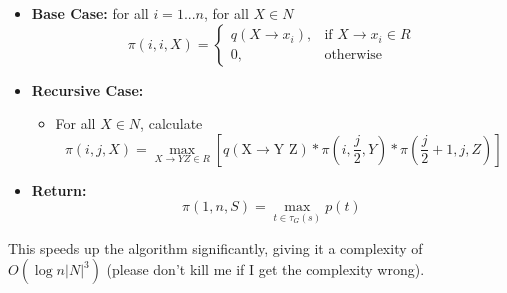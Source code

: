 \documentclass[11pt]{scrartcl}
\newcommand{\n}[1]{\ensuremath{\text{#1}}}
\begin{document}
\begin{itemize}
\item \textbf{Base Case:} for all $i = 1 ... n$, for all $X \in N$
\[ \pi(i,i,X) = \begin{cases}
q(X \rightarrow x_i),& \n{if } X \rightarrow x_i \in R \\
0,& \n{otherwise}
\end{cases}
\]
\item \textbf{Recursive Case:}
\begin{itemize}
\item For all $X \in N$, calculate
\[ \pi(i, j, X) = \max_{X \rightarrow YZ \in R} \left[ q(\n{X} \rightarrow \n{Y Z}) * \pi\left(i, \frac{j}{2}, Y\right) * \pi\left(\frac{j}{2}+1, j, Z\right) \right] \]
\end{itemize}
\item \textbf{Return:} 
\[\pi(1, n, S) = \max_{t \in \tau_G(s)} p(t)\]
\end{itemize}

This speeds up the algorithm significantly, giving it a complexity of $O(\log{n} |N|^3)$ (please don't kill me if I get the complexity wrong).
\end{document}

